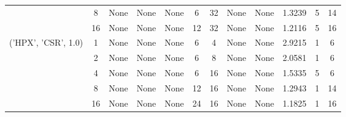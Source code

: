 \begin{tabular}{cccccccccccc}
& 8& None& None& None& 6& 32& None& None& 1.3239& 5& 14\\
& 16& None& None& None& 12& 32& None& None& 1.2116& 5& 16\\
\hline
\multirow{5}{*}{('HPX', 'CSR', 1.0)}& 1& None& None& None& 6& 4& None& None& 2.9215& 1& 6\\
& 2& None& None& None& 6& 8& None& None& 2.0581& 1& 6\\
& 4& None& None& None& 6& 16& None& None& 1.5335& 5& 6\\
& 8& None& None& None& 12& 16& None& None& 1.2943& 1& 14\\
& 16& None& None& None& 24& 16& None& None& 1.1825& 1& 16\\
\hline
\end{tabular}
